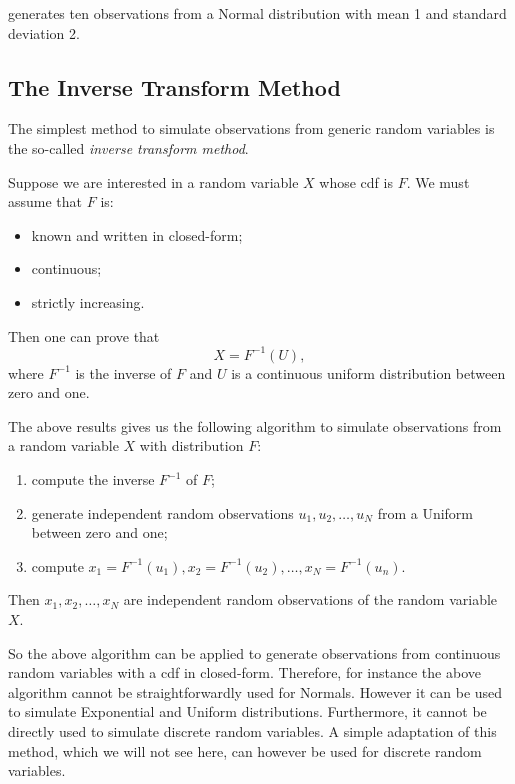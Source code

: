 \documentclass[
]{book}
\theoremstyle{definition}
\theoremstyle{definition}
\theoremstyle{definition}
\theoremstyle{definition}
\theoremstyle{remark}
\begin{document}
generates ten observations from a Normal distribution with mean 1 and standard deviation 2.

\hypertarget{the-inverse-transform-method}{%
\subsection{The Inverse Transform Method}\label{the-inverse-transform-method}}

The simplest method to simulate observations from generic random variables is the so-called \emph{inverse transform method}.

Suppose we are interested in a random variable \(X\) whose cdf is \(F\). We must assume that \(F\) is:

\begin{itemize}
\item
  known and written in closed-form;
\item
  continuous;
\item
  strictly increasing.
\end{itemize}

Then one can prove that
\[
X = F^{-1}(U),
\]
where \(F^{-1}\) is the inverse of \(F\) and \(U\) is a continuous uniform distribution between zero and one.

The above results gives us the following algorithm to simulate observations from a random variable \(X\) with distribution \(F\):

\begin{enumerate}
\def\labelenumi{\arabic{enumi}.}
\item
  compute the inverse \(F^{-1}\) of \(F\);
\item
  generate independent random observations \(u_1,u_2,\dots,u_N\) from a Uniform between zero and one;
\item
  compute \(x_1=F^{-1}(u_1), x_2=F^{-1}(u_2),\dots,x_N=F^{-1}(u_n)\).
\end{enumerate}

Then \(x_1,x_2,\dots,x_N\) are independent random observations of the random variable \(X\).

So the above algorithm can be applied to generate observations from continuous random variables with a cdf in closed-form. Therefore, for instance the above algorithm cannot be straightforwardly used for Normals. However it can be used to simulate Exponential and Uniform distributions. Furthermore, it cannot be directly used to simulate discrete random variables. A simple adaptation of this method, which we will not see here, can however be used for discrete random variables.
\end{document}
